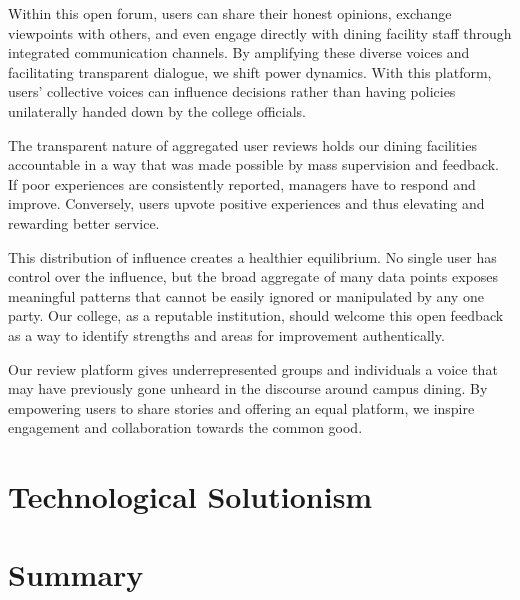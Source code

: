\documentclass[10pt,twocolumn]{article}
\begin{document}
Within this open forum, users can share their honest opinions, exchange viewpoints with others, and even engage directly with dining facility staff through integrated communication channels. By amplifying these diverse voices and facilitating transparent dialogue, we shift power dynamics. With this platform, users' collective voices can influence decisions rather than having policies unilaterally handed down by the college officials.

The transparent nature of aggregated user reviews holds our dining facilities accountable in a way that was made possible by mass supervision and feedback. If poor experiences are consistently reported, managers have to respond and improve. Conversely, users upvote positive experiences and thus elevating and rewarding better service.

This distribution of influence creates a healthier equilibrium. No single user has control over the influence, but the broad aggregate of many data points exposes meaningful patterns that cannot be easily ignored or manipulated by any one party.  Our college, as a reputable institution, should welcome this open feedback as a way to identify strengths and areas for improvement authentically.

Our review platform gives underrepresented groups and individuals a voice that may have previously gone unheard in the discourse around campus dining. By empowering users to share stories and offering an equal platform, we inspire engagement and collaboration towards the common good.

\section{Technological Solutionism}

\section{Summary}
\end{document}
